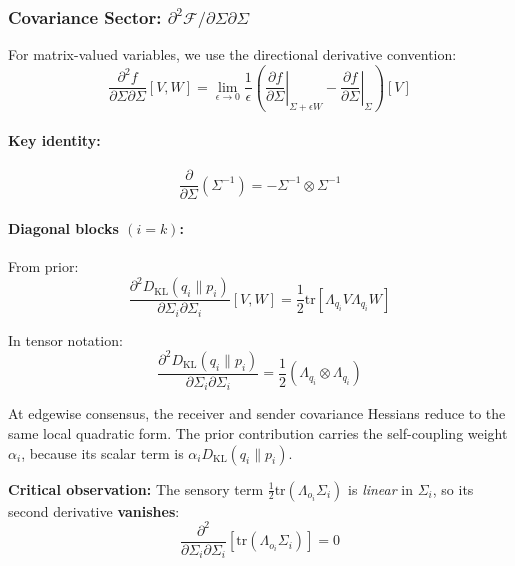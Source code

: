 \documentclass[12pt]{article}
\begin{document}
\subsubsection{Covariance Sector: $\partial^2\mathcal{F}/\partial\Sigma\partial\Sigma$}

For matrix-valued variables, we use the directional derivative convention:
\begin{equation}
\frac{\partial^2 f}{\partial \Sigma \partial \Sigma}[V, W] = \lim_{\epsilon \to 0} \frac{1}{\epsilon}\left(\left.\frac{\partial f}{\partial \Sigma}\right|_{\Sigma + \epsilon W} - \left.\frac{\partial f}{\partial \Sigma}\right|_{\Sigma}\right)[V]
\end{equation}

\paragraph{Key identity:}
\begin{equation}
\frac{\partial}{\partial \Sigma}(\Sigma^{-1}) = -\Sigma^{-1} \otimes \Sigma^{-1}
\end{equation}

\paragraph{Diagonal blocks $(i = k)$:}

From prior:
\begin{equation}
\frac{\partial^2 D_{\mathrm{KL}}(q_i \| p_i)}{\partial \Sigma_i \partial \Sigma_i}[V, W] = \frac{1}{2}\mathrm{tr}\left[\Lambda_{q_i}V\Lambda_{q_i}W\right]
\end{equation}

In tensor notation:
\begin{equation}
\frac{\partial^2 D_{\mathrm{KL}}(q_i \| p_i)}{\partial \Sigma_i \partial \Sigma_i} = \frac{1}{2}(\Lambda_{q_i} \otimes \Lambda_{q_i})
\end{equation}

At edgewise consensus, the receiver and sender covariance Hessians reduce to the same local quadratic form. The prior contribution carries the self-coupling weight $\alpha_i$, because its scalar term is $\alpha_i D_{\mathrm{KL}}(q_i\|p_i)$.

\textbf{Critical observation:} The sensory term $\frac{1}{2}\mathrm{tr}(\Lambda_{o_i}\Sigma_i)$ is \textit{linear} in $\Sigma_i$, so its second derivative \textbf{vanishes}:
\begin{equation}
\frac{\partial^2}{\partial \Sigma_i \partial \Sigma_i}\left[\mathrm{tr}(\Lambda_{o_i}\Sigma_i)\right] = 0
\end{equation}
\end{document}
